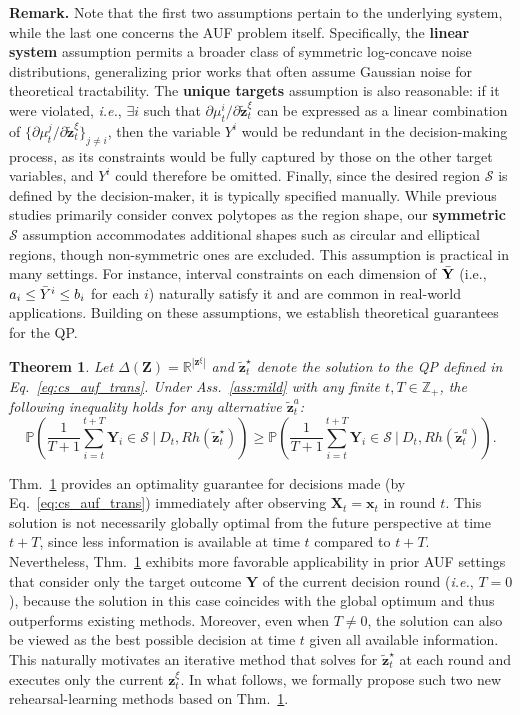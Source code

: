 \documentclass{article}
\theoremstyle{plain}
\newtheorem{theorem}{Theorem}[section]
\theoremstyle{definition}
\theoremstyle{remark}
\def \ie {\textit{i.e.}}
\def \Eq {Eq.}
\def \thm {Thm.}
\def \x {\mathbf{x}}
\def \Z {\mathbf{Z}}
\def \sS {\mathcal{S}}
\def \X {\mathbf{X}}
\def \Y {\mathbf{Y}}
\def \z {\mathbf{z}}
\begin{document}
\textbf{Remark.} Note that the first two assumptions pertain to the underlying system, while the last one concerns the AUF problem itself. 
Specifically, the \textbf{linear system} assumption permits a broader class of symmetric log-concave noise distributions, generalizing prior works that often assume Gaussian noise for theoretical tractability.  
The \textbf{unique targets} assumption is also reasonable: if it were violated, \ie, \(\exists i\) such that \(\partial \mu_t^i / \partial \tilde{\z}^\xi_t\) can be expressed as a linear combination of \(\{\partial \mu_t^j / \partial \tilde{\z}^\xi_t\}_{j \neq i}\), then the variable \(Y^i\) would be redundant in the decision-making process, as its constraints would be fully captured by those on the other target variables, and \(Y^i\) could therefore be omitted. 
Finally, since the desired region \(\sS\) is defined by the decision-maker, it is typically specified manually. 
While previous studies primarily consider convex polytopes as the region shape, our \textbf{symmetric \(\sS\)} assumption accommodates additional shapes such as circular and elliptical regions, though non-symmetric ones are excluded.
This assumption is practical in many settings. For instance, interval constraints on each dimension of \(\Bar{\Y}\) (i.e., \(a_i \leq \Bar{Y}^i \leq b_i\) for each \(i\)) naturally satisfy it and are common in real-world applications.  
Building on these assumptions, we establish theoretical guarantees for the QP.


\begin{theorem}
  \label{thm:main}
  Let \(\Delta(\Z) = \mathbb{R}^{|\z^\xi|}\) and \(\tilde{\z}_t^\star\) denote the solution to the QP defined in \Eq~\eqref{eq:cs_auf_trans}.  
  Under Ass.~\ref{ass:mild} with any finite \(t, T\in \mathbb{Z}_+\), the following inequality holds for any alternative \(\tilde{\z}^a_t\):
  \[
    \mathbb{P}\left(\frac{1}{T+1}\sum_{i=t}^{t+T}\Y_{i} \in\sS\ \Big| \ D_t, Rh(\tilde{\z}_t^\star) \right) 
    \geq \mathbb{P}\left(\frac{1}{T+1}\sum_{i=t}^{t+T}\Y_{i} \in\sS\ \Big| \ D_t, Rh(\tilde{\z}^a_t)\right).
  \]
\end{theorem}


\thm~\ref{thm:main} provides an optimality guarantee for decisions made (by \Eq~\eqref{eq:cs_auf_trans}) immediately after observing \(\X_t = \x_t\) in round \(t\). 
This solution is not necessarily globally optimal from the future perspective at time \(t + T\), since less information is available at time \(t\) compared to \(t + T\). 
Nevertheless, \thm~\ref{thm:main} exhibits more favorable applicability in prior AUF settings that consider only the target outcome \(\Y\) of the current decision round (\ie, \(T = 0\)), 
because the solution in this case coincides with the global optimum and thus outperforms existing methods. 
Moreover, even when \(T \neq 0\), the solution can also be viewed as the best possible decision at time \(t\) given all available information. 
This naturally motivates an iterative method that solves for \(\tilde{\z}_t^\star\) at each round and executes only the current \(\z_t^\xi\). 
In what follows, we formally propose such two new rehearsal-learning methods based on \thm~\ref{thm:main}. 
\end{document}

